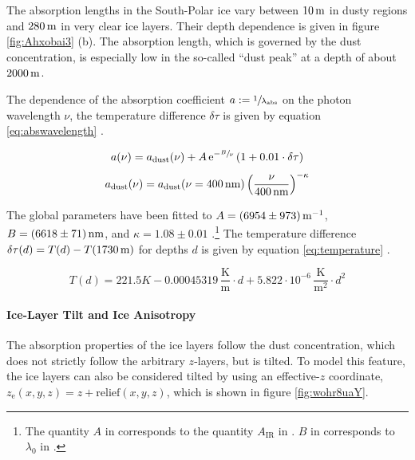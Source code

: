 The absorption lengths in the South-Polar ice vary between \(10\text{\,m}\) in
dusty regions and \(280\text{\,m}\) in very clear ice layers. Their depth
dependence is given in figure \ref{fig:Ahxobai3} (b). The absorption
length, which is governed by the dust concentration, is especially low
in the so-called ``dust peak'' at a depth of about \(2000\text{\,m}\).
\cite{ackermann, ppcpaper, icepaper}

The dependence of the absorption coefficient
\(a := \sfrac{1}{\lambda_\text{abs}}\) on the photon wavelength \(\nu\), the
temperature difference \(\delta\tau\) is given by equation
\ref{eq:abswavelength} \cite{icepaper}.

\begin{equation}
  a(\nu) = a_\text{dust}(\nu) + A\,\mathrm{e}^{-\sfrac{B}{\nu}}\, (1 + 0.01 \cdot \delta\tau)
  \label{eq:abswavelength}
\end{equation}\begin{equation}
  a_\text{dust}(\nu) = a_\text{dust}(\nu = 400\text{\,nm}) \left(\frac{\nu}{400\text{\,nm}}\right)^{-\kappa}
\end{equation}

The global parameters have been fitted to \(A = (6954 \pm 973)\text{\,m}^{-1}\),
\(B = (6618 \pm 71)\text{\,nm}\), and \(\kappa = 1.08 \pm 0.01\)
\cite[section 5.2]{ackermann}.\footnote{The quantity $A$ in \cite{icepaper} corresponds to the quantity $A_\text{IR}$ in \cite{ackermann}. $B$ in \cite{icepaper} corresponds to $\lambda_0$ in \cite{ackermann}.}
The temperature difference \(\delta\tau(d) = T(d) - T(1730\text{\,m})\) for
depths \(d\) is given by equation \ref{eq:temperature} \cite{icepaper}.

\begin{equation}
  T(d) = 221.5\unit{K} - 0.00045319\,\frac{\text{K}}{\text{m}}\cdot d + 5.822 \cdot 10^{-6}\,\frac{\text{K}}{\text{m}^2} \cdot d^2
  \label{eq:temperature}
\end{equation}

\paragraph{Ice-Layer Tilt and Ice Anisotropy}

The absorption properties of the ice layers follow the dust
concentration, which does not strictly follow the arbitrary
\(z\)-layers, but is tilted. To model this feature, the ice layers can
also be considered tilted by using an effective-\(z\) coordinate,
\(z_\text{e}(x,y,z) = z + \text{relief}(x,y,z)\), which is shown in
figure \ref{fig:wohr8uaY}. \cite{icepaper}

